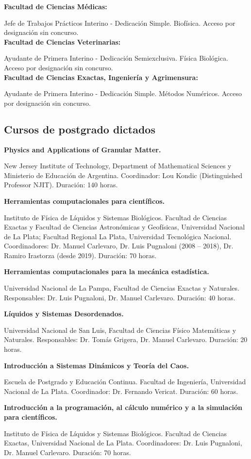 \textbf{Facultad de Ciencias Médicas:}

 Jefe de Trabajos Prácticos Interino - Dedicación Simple. Biofísica. Acceso por designación sin concurso. \\

\textbf{Facultad de Ciencias Veterinarias:}

 Ayudante de Primera Interino - Dedicación Semiexclusiva. Física Biológica. Acceso por designación sin concurso.\\

\textbf{Facultad de Ciencias Exactas, Ingeniería y Agrimensura:}

 Ayudante de Primera Interino - Dedicación Simple. Métodos Numéricos. Acceso por designación sin concurso.

\subsection{Cursos de postgrado dictados}

 \textbf{Physics and Applications of Granular Matter.}

New Jersey Institute of Technology, Department of Mathematical Sciences y Ministerio de Educación de Argentina. Coordinador: Lou Kondic (Distinguished Professor NJIT). Duración: 140 horas.

 \textbf{Herramientas computacionales para científicos.}

 Instituto de Física de Líquidos y Sistemas Biológicos. Facultad de Ciencias Exactas y Facultad de Ciencias Astronómicas y Geofísicas, Universidad Nacional de La Plata; Facultad Regional La Plata, Universidad Tecnológica Nacional. Coordinadores: Dr. Manuel Carlevaro, Dr. Luis Pugnaloni (2008 -- 2018), Dr. Ramiro Irastorza (desde 2019). Duración: 70 horas.

  \textbf{Herramientas computacionales para la mecánica estadística.}

Universidad Nacional de La Pampa, Facultad de Ciencias Exactas y Naturales. Responsables: Dr. Luis Pugnaloni, Dr. Manuel Carlevaro. Duración: 40 horas.

 
 \textbf{Líquidos y Sistemas Desordenados.}

Universidad Nacional de San Luis, Facultad de Ciencias Físico Matemáticas y Naturales. Responsables: Dr. Tomás Grigera, Dr. Manuel Carlevaro. Duración: 20 horas.


  \textbf{Introducción a Sistemas Dinámicos y Teoría del Caos.}
 
 Escuela de Postgrado y Educación Continua. Facultad de Ingeniería, Universidad Nacional de La Plata. Coordinador: Dr. Fernando Vericat. Duración: 60 horas.
 
  \textbf{Introducción a la programación, al cálculo numérico y a la simulación para científicos.}
 
 Instituto de Física de Líquidos y Sistemas Biológicos. Facultad de Ciencias Exactas, Universidad Nacional de La Plata. Coordinadores: Dr. Luis Pugnaloni, Dr. Manuel Carlevaro. Duración: 70 horas.
